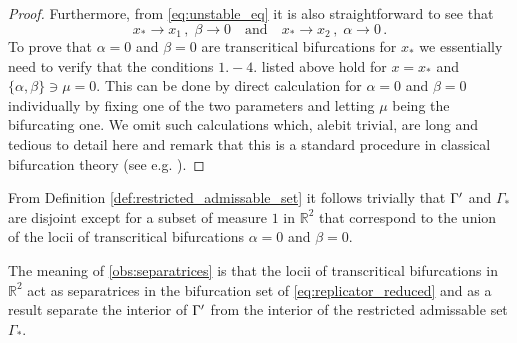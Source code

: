 \documentclass[../main.tex]{subfiles}
\begin{document}
\begin{proof}
     Furthermore, from \eqref{eq:unstable_eq} it is also straightforward to see that
     \begin{equation*}
          x_{*}\to x_{1}\,,\;\beta\to0\quad \text{and} \quad x_{*}\to x_{2} \,,\;\alpha\to0\,.
     \end{equation*}
     To prove that $\alpha=0$ and $\beta=0$ are transcritical bifurcations for $x_{*}$ we essentially need to verify that the conditions $1.-4.$ listed above hold for $x=x_{*}$ and $\{\alpha,\beta\}\ni\mu=0$.
     This can be done by direct calculation for $\alpha=0$ and $\beta=0$ individually by fixing one of the two parameters and letting $\mu$ being the bifurcating one.
     We omit such calculations which, alebit trivial, are long and tedious to detail here and remark that this is a standard procedure in classical bifurcation theory (see e.g. \cite{Glendinning94}).
\end{proof}

\begin{observation}\label{obs:separatrices}
     From Definition \ref{def:restricted_admissable_set} it follows trivially that $\Gamma'$ and $\Gamma_{*}$ are disjoint except for a subset of measure $1$ in $\mathbb{R}^{2}$ that correspond to the union of the locii of transcritical bifurcations $\alpha = 0$ and $\beta = 0$.
\end{observation}

The meaning of \ref{obs:separatrices} is that the locii of transcritical bifurcations in $\mathbb{R}^{2}$ act as separatrices in the bifurcation set of \eqref{eq:replicator_reduced} and as a result separate the interior of $\Gamma'$ from the interior of the restricted admissable set $\Gamma_{*}$.


\end{document}
